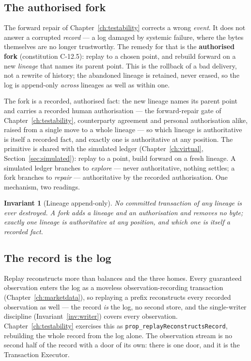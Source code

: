 \documentclass[11pt,a4paper]{article}
\newtheorem{invariant}[definition]{Invariant}
\begin{document}
\subsection{The authorised fork}

The forward repair of Chapter~\ref{ch:testability} corrects a wrong \emph{event}. It does not
answer a corrupted \emph{record} --- a log damaged by systemic failure, where the bytes
themselves are no longer trustworthy. The remedy for that is the \textbf{authorised fork}
(constitution C-12.5): replay to a chosen point, and rebuild forward on a new \emph{lineage}
that names its parent point. This is the rollback of a bad delivery, not a rewrite of history;
the abandoned lineage is retained, never erased, so the log is append-only \emph{across}
lineages as well as within one.

The fork is a recorded, authorised fact: the new lineage names its parent point and carries
a recorded human authorisation --- the forward-repair gate of Chapter~\ref{ch:testability},
counterparty agreement and personal authorisation alike, raised
from a single move to a whole lineage --- so which lineage is authoritative is itself a
recorded fact, and exactly one is authoritative at any position. The primitive is shared
with the simulated ledger (Chapter~\ref{ch:virtual}, Section~\ref{sec:simulated}): replay
to a point, build forward on a fresh lineage. A simulated ledger branches to \emph{explore}
--- never authoritative, nothing settles; a fork branches to \emph{repair} --- authoritative
by the recorded authorisation. One mechanism, two readings.

\begin{invariant}[Lineage append-only]\label{inv:lineage}
No committed transaction of any lineage is ever destroyed. A fork adds a lineage and an
authorisation and removes no byte; exactly one lineage is authoritative at any position, and
which one is itself a recorded fact.
\end{invariant}

\subsection{The record is the log}\label{sec:record-is-log}

Replay reconstructs more than balances and the three homes. Every guaranteed observation
enters the log as a moveless observation-recording transaction
(Chapter~\ref{ch:marketdata}), so replaying a prefix reconstructs every recorded
observation as well --- the record \emph{is} the log, no second store, and the
single-writer discipline (Invariant~\ref{inv:writer}) covers every observation.
Chapter~\ref{ch:testability} exercises this as
\texttt{prop\_replayReconstructsRecord}, rebuilding the whole record from the log alone.
The observation stream is no second half of the record with a door of its own: there is
one door, and it is the Transaction Executor.
\end{document}
